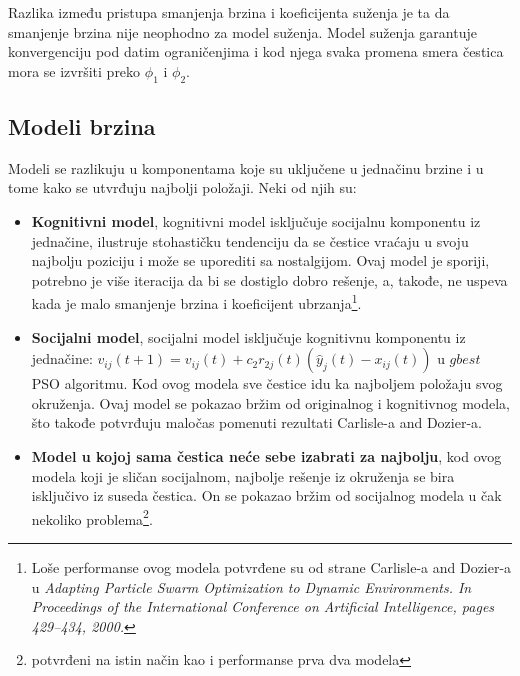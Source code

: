 \documentclass[a4paper]{article}
\begin{document}
Razlika između pristupa smanjenja brzina i koeficijenta suženja je ta da smanjenje brzina nije neophodno za model suženja. Model suženja garantuje konvergenciju pod datim ograničenjima i kod njega svaka promena smera čestica mora se izvršiti preko $\phi_1$ i $\phi_2$.

\subsection{Modeli brzina}
Modeli se razlikuju u komponentama koje su uključene u jednačinu brzine i u tome kako se utvrđuju najbolji položaji. Neki od njih su:
\begin{itemize}
    \item \textbf{Kognitivni model}, kognitivni model isključuje socijalnu komponentu iz jednačine, ilustruje stohastičku tendenciju  da se čestice vraćaju u svoju najbolju poziciju i može se uporediti sa nostalgijom. Ovaj model je sporiji, potrebno je više iteracija da bi se dostiglo dobro rešenje, a, takođe, ne uspeva kada je malo smanjenje brzina i koeficijent ubrzanja\footnote{Loše performanse ovog modela potvrđene su od strane Carlisle-a and Dozier-a u \textit{Adapting Particle Swarm Optimization to Dynamic Environments. In Proceedings of the International Conference on Artificial Intelligence, pages 429–434, 2000.}}.
    \item \textbf{Socijalni model}, socijalni model isključuje kognitivnu komponentu iz jednačine: $v_{ij} (t + 1) = v_{ij} (t) + c_2r_{2j} (t)(\hat{y}_j (t) - x_{ij} (t))$ u $gbest$ PSO algoritmu. Kod ovog modela sve čestice idu ka najboljem položaju svog okruženja. Ovaj model se pokazao bržim od originalnog i kognitivnog modela, što takođe potvrđuju maločas pomenuti rezultati Carlisle-a and Dozier-a.
    \item \textbf{Model u kojoj sama čestica neće sebe izabrati za najbolju}, kod ovog modela koji je sličan socijalnom, najbolje rešenje iz okruženja se bira isključivo iz suseda čestica. On se pokazao bržim od socijalnog modela u čak nekoliko problema\footnote{potvrđeni na istin način kao i performanse prva dva modela}.
\end{itemize}
\end{document}
